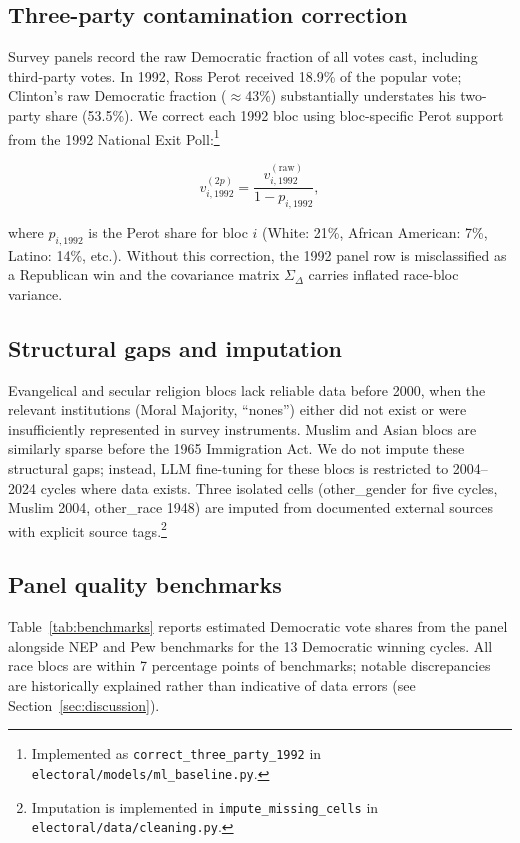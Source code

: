 \documentclass[12pt, letterpaper]{article}
\theoremstyle{definition}
\newcommand{\SigmaDelta}{\Sigma_{\Delta}}
\begin{document}
\subsection{Three-party contamination correction}
\label{sec:perot}

Survey panels record the raw Democratic fraction of all votes cast, including
third-party votes. In 1992, Ross Perot received 18.9\% of the popular vote;
Clinton's raw Democratic fraction ($\approx$43\%) substantially understates
his two-party share (53.5\%). We correct each 1992 bloc using bloc-specific
Perot support from the 1992 National Exit Poll:\footnote{Implemented as
\texttt{correct\_three\_party\_1992} in
\texttt{electoral/models/ml\_baseline.py}.}

\begin{equation}
  v_{i,1992}^{(2p)} = \frac{v_{i,1992}^{(\text{raw})}}{1 - p_{i,1992}},
  \label{eq:perot}
\end{equation}

where $p_{i,1992}$ is the Perot share for bloc $i$ (White: 21\%, African
American: 7\%, Latino: 14\%, etc.). Without this correction, the 1992
panel row is misclassified as a Republican win and the covariance matrix
$\SigmaDelta$ carries inflated race-bloc variance.

\subsection{Structural gaps and imputation}

Evangelical and secular religion blocs lack reliable data before 2000, when
the relevant institutions (Moral Majority, ``nones'') either did not exist or
were insufficiently represented in survey instruments. Muslim and Asian blocs
are similarly sparse before the 1965 Immigration Act. We do not impute these
structural gaps; instead, LLM fine-tuning for these blocs is restricted to
2004--2024 cycles where data exists. Three isolated cells (other\_gender for
five cycles, Muslim 2004, other\_race 1948) are imputed from documented
external sources with explicit source tags.\footnote{Imputation is implemented
in \texttt{impute\_missing\_cells} in \texttt{electoral/data/cleaning.py}.}

\subsection{Panel quality benchmarks}

Table~\ref{tab:benchmarks} reports estimated Democratic vote shares from the
panel alongside NEP and Pew benchmarks for the 13 Democratic winning cycles.
All race blocs are within 7 percentage points of benchmarks; notable
discrepancies are historically explained rather than indicative of data
errors (see Section~\ref{sec:discussion}).
\end{document}
